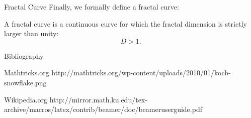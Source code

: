 \documentclass[10pt]{beamer}
\begin{document}
\begin{frame}{Fractal Curve}
  Finally, we formally define a fractal curve:
  \begin{defn}
    A fractal curve is a continuous curve for which the fractal dimension is strictly larger than unity: 
    $$D > 1.$$
  \end{defn}
  
\end{frame}

\begin{frame}{Bibliography}
  \begin{thebibliography}{}
    Mathtricks.org
    \newblock http://mathtricks.org/wp-content/uploads/2010/01/koch-snowflake.png
    
    Wikipedia.org
    \newblock http://mirror.math.ku.edu/tex-archive/macros/latex/contrib/beamer/doc/beameruserguide.pdf
  \end{thebibliography}
\end{frame}
\end{document}
